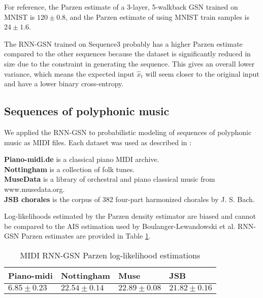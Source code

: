 For reference, the Parzen estimate of a 3-layer, 5-walkback GSN trained on MNIST is $120 \pm 0.8$, and the Parzen estimate of using MNIST train samples is $24 \pm 1.6$.

The RNN-GSN trained on Sequence3 probably has a higher Parzen estimate compared to the other sequences because the dataset is significantly reduced in size due to the constraint in generating the sequence. This gives an overall lower variance, which means the expected input $\hat{x}_t$ will seem closer to the original input and have a lower binary cross-entropy.

\subsection{Sequences of polyphonic music}
	We applied the RNN-GSN to probabilistic modeling of sequences of polyphonic music as MIDI files. Each dataset was used as described in \cite{rnnrbm}:

\textbf{Piano-midi.de} is a classical piano MIDI archive.\\
\textbf{Nottingham} is a collection of folk tunes.\\
\textbf{MuseData} is a library of orchestral and piano classical music from www.musedata.org.\\
\textbf{JSB chorales} is the corpus of 382 four-part harmonized chorales by J. S. Bach.
	
Log-likelihoods estimated by the Parzen density estimator are biased and cannot be compared to the AIS estimation used by Boulanger-Lewandowski et al. RNN-GSN Parzen estimates are provided in Table \ref{tab:parzen}.


\begin {table}[H]
 \caption {MIDI RNN-GSN Parzen log-likelihood estimations} \label{tab:parzen}
\begin{tabular*}{0.5\textwidth}{ l l l l}
\hline
Piano-midi & Nottingham & Muse & JSB\\
\hline
$6.85 \pm 0.23$ & $22.54 \pm 0.14$ & $22.89 \pm 0.08$ & $21.82 \pm 0.16$
\end{tabular*}
\end{table}

